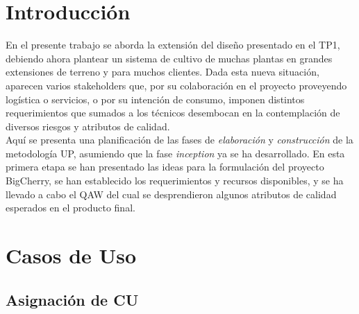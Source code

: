 \section{Introducción}

En el presente trabajo se aborda la extensión del diseño presentado en el TP1, debiendo ahora plantear un sistema de cultivo de muchas plantas en grandes extensiones de terreno y para muchos clientes. Dada esta nueva situación, aparecen varios stakeholders que, por su colaboración en el proyecto proveyendo logística o servicios, o por su intención de consumo, imponen distintos requerimientos que sumados a los técnicos desembocan en la contemplación de diversos riesgos y atributos de calidad.\\
Aquí se presenta una planificación de las fases de \textit{elaboración} y \textit{construcción} de la metodología UP, asumiendo que la fase \textit{inception} ya se ha desarrollado. En esta primera etapa se han presentado las ideas para la formulación del proyecto BigCherry, se han establecido los requerimientos y recursos disponibles, y se ha llevado a cabo el QAW del cual se desprendieron algunos atributos de calidad esperados en el producto final.

\section{Casos de Uso}

\subsection{Asignación de CU}


